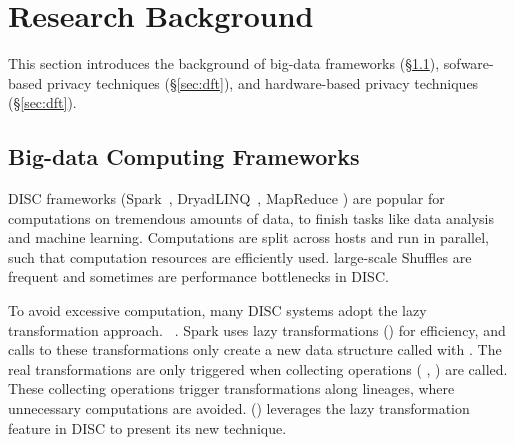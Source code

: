 \vspace{-.15in}\section{Research Background} 
\label{sec:background}\vspace{-.075in}


This section introduces the background of big-data 
frameworks (\S\ref{sec:bigdata}), sofware-based privacy techniques  
(\S\ref{sec:dft}), and hardware-based privacy techniques (\S\ref{sec:dft}).

\vspace{-.15in}\subsection{Big-data Computing Frameworks} 
\label{sec:bigdata}\vspace{-.075in}

DISC frameworks (\eg Spark~\cite{nsdi12:spark},
DryadLINQ~\cite{osdi08:dryad}, MapReduce \cite{mapreduce}) are popular for 
computations
on tremendous
amounts of data, to finish tasks like data analysis and machine learning.
Computations are split across hosts and run in parallel, such that
computation resources are efficiently used.
large-scale
Shuffles are frequent and sometimes are performance bottlenecks in DISC.



To avoid excessive computation, many DISC systems adopt the lazy transformation 
approach.
~\cite{pig:vldb08,nsdi12:spark,osdi08:dryad}.
Spark uses lazy transformations (\eg {}) for efficiency,
and calls to these transformations only create a new data structure called 
 with .
The real transformations are only triggered when collecting operations (\eg 
{},
) are called. These collecting operations trigger transformations 
along
lineages, where unnecessary computations are avoided. 
\kakute () leverages the lazy transformation
feature in DISC to present its new \lazyp technique.

